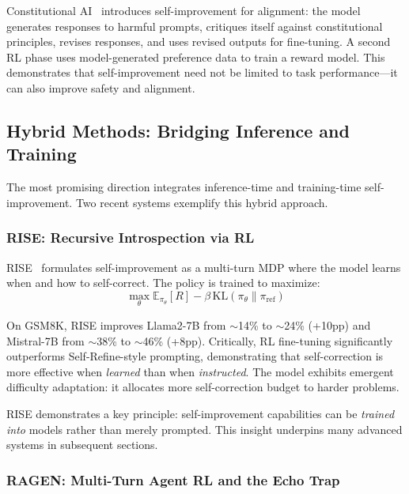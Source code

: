 Constitutional AI~\citep{bai2022constitutional} introduces self-improvement for alignment: the model generates responses to harmful prompts, critiques itself against constitutional principles, revises responses, and uses revised outputs for fine-tuning. A second RL phase uses model-generated preference data to train a reward model. This demonstrates that self-improvement need not be limited to task performance---it can also improve safety and alignment.

\subsection{Hybrid Methods: Bridging Inference and Training}
\label{sec:hybrid-methods}

The most promising direction integrates inference-time and training-time self-improvement. Two recent systems exemplify this hybrid approach.

\subsubsection{RISE: Recursive Introspection via RL}
\label{sec:rise}

RISE~\citep{qu2024rise} formulates self-improvement as a multi-turn MDP where the model learns when and how to self-correct. The policy is trained to maximize:
\begin{equation}
    \max_\theta \mathbb{E}_{\pi_\theta}[R] - \beta \, \text{KL}(\pi_\theta \| \pi_{\text{ref}})
    \label{eq:rise-objective}
\end{equation}

On GSM8K, RISE improves Llama2-7B from $\sim$14\% to $\sim$24\% (+10pp) and Mistral-7B from $\sim$38\% to $\sim$46\% (+8pp). Critically, RL fine-tuning significantly outperforms Self-Refine-style prompting, demonstrating that self-correction is more effective when \emph{learned} than when \emph{instructed}. The model exhibits emergent difficulty adaptation: it allocates more self-correction budget to harder problems.

RISE demonstrates a key principle: self-improvement capabilities can be \emph{trained into} models rather than merely prompted. This insight underpins many advanced systems in subsequent sections.

\subsubsection{RAGEN: Multi-Turn Agent RL and the Echo Trap}
\label{sec:ragen}


